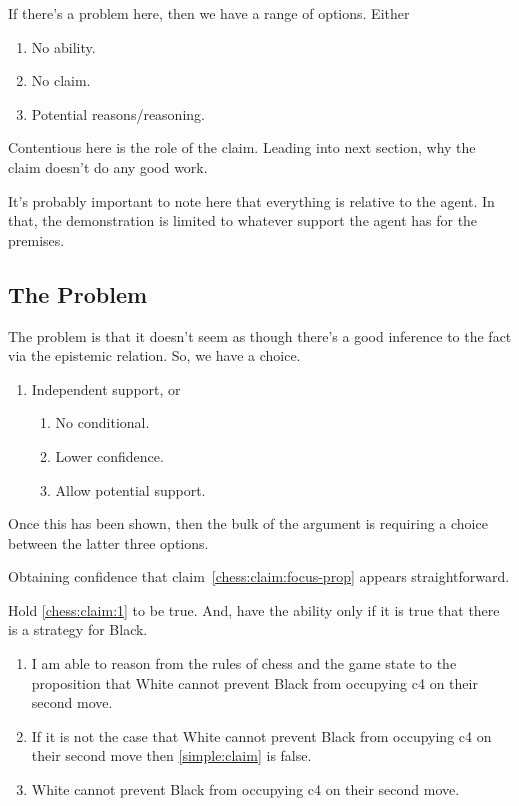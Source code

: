 \documentclass[10pt]{article}
\begin{document}
If there's a problem here, then we have a range of options.
Either
\begin{enumerate}
\item No ability.
\item No claim.
\item Potential reasons/reasoning.
\end{enumerate}

Contentious here is the role of the claim.
{
  \color{red}
  Leading into next section, why the claim doesn't do any good work.
}

\begin{note}
  It's probably important to note here that everything is relative to the agent.
  In that, the demonstration is limited to whatever support the agent has for the premises.
\end{note}

\subsection{The Problem}
\label{sec:problem}

\begin{note}[Overview]
  The problem is that it doesn't seem as though there's a good inference to the fact via the epistemic relation.
  So, we have a choice.
  \begin{enumerate}
  \item Independent support, or
    \begin{enumerate}
    \item No conditional.
    \item Lower confidence.
    \item Allow potential support.
    \end{enumerate}
  \end{enumerate}
  Once this has been shown, then the bulk of the argument is requiring a choice between the latter three options.
\end{note}

Obtaining confidence that claim~\ref{chess:claim:focus-prop} appears straightforward.

Hold \ref{chess:claim:1} to be true.
And, have the ability only if it is true that there is a strategy for Black.

\begin{enumerate}
\item\label{simple:claim} I am able to reason from the rules of chess and the game state to the proposition that White cannot prevent Black from occupying c4 on their second move.
\item\label{simple:necessity} If it is not the case that White cannot prevent Black from occupying c4 on their second move then \ref{simple:claim} is false.
\item\label{simple:focus} White cannot prevent Black from occupying c4 on their second move.
\end{enumerate}
\end{document}
